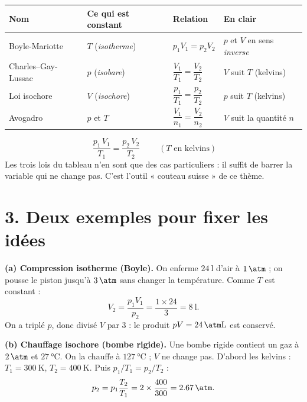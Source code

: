 \documentclass[11pt,a4paper]{article}
\begin{document}
\begin{center}\renewcommand{\arraystretch}{1.35}\small
\begin{tabular}{l l l l}
\toprule
\rowcolor{primary!12}
\textbf{Nom} & \textbf{Ce qui est constant} & \textbf{Relation} & \textbf{En clair}\\
\midrule
Boyle-Mariotte      & $T$ (\emph{isotherme}) & $p_1V_1=p_2V_2$ & $p$ et $V$ en sens \emph{inverse}\\
Charles--Gay-Lussac & $p$ (\emph{isobare})   & $\dfrac{V_1}{T_1}=\dfrac{V_2}{T_2}$ & $V$ suit $T$ (kelvins)\\
Loi isochore        & $V$ (\emph{isochore})  & $\dfrac{p_1}{T_1}=\dfrac{p_2}{T_2}$ & $p$ suit $T$ (kelvins)\\
Avogadro            & $p$ et $T$             & $\dfrac{V_1}{n_1}=\dfrac{V_2}{n_2}$ & $V$ suit la quantité $n$\\
\bottomrule
\end{tabular}
\end{center}

\begin{formule}
\[ \boxed{\;\dfrac{p_1\,V_1}{T_1}=\dfrac{p_2\,V_2}{T_2}\;}\qquad(T\text{ en kelvins}) \]
Les trois lois du tableau n'en sont que des cas particuliers : il suffit de barrer la variable qui
ne change pas. C'est l'outil « couteau suisse » de ce thème.
\end{formule}

\section*{3. Deux exemples pour fixer les idées}

\textbf{(a) Compression isotherme (Boyle).} On enferme $\qty{24}{\litre}$ d'air à $\qty{1}{\atm}$ ; on
pousse le piston jusqu'à $\qty{3}{\atm}$ sans changer la température. Comme $T$ est constant :
\[ V_2=\frac{p_1V_1}{p_2}=\frac{1\times24}{3}=\qty{8}{\litre}. \]
On a triplé $p$, donc divisé $V$ par $3$ : le produit $pV=\qty{24}{\atm\litre}$ est conservé.

\textbf{(b) Chauffage isochore (bombe rigide).} Une bombe rigide contient un gaz à $\qty{2}{\atm}$ et
$\qty{27}{\degreeCelsius}$. On la chauffe à $\qty{127}{\degreeCelsius}$ ; $V$ ne change pas. D'abord les
kelvins : $T_1=\qty{300}{\kelvin}$, $T_2=\qty{400}{\kelvin}$. Puis $p_1/T_1=p_2/T_2$ :
\[ p_2=p_1\frac{T_2}{T_1}=2\times\frac{400}{300}=\qty{2.67}{\atm}. \]
\end{document}
